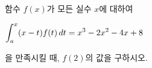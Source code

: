 함수 $f(x)$가 모든 실수 $x$에 대하여 \par\smallskip\noindent\hspace*{1.5em}$\displaystyle\int_{a}^{x}(x-t)f(t)\mkern3mu dt=x^3-2x^2-4x+8$\par\smallskip\noindent 을 만족시킬 때, $f(2)$의 값을 구하시오. 
